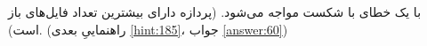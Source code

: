 \section{}
\paragraph{}\label{hint:306}
 با یک خطای  با شکست مواجه می‌شود. (پردازه دارای بیشترین تعداد فایل‌های باز است). (راهنماییِ بعدی \ref{hint:185}، جواب \ref{answer:60})